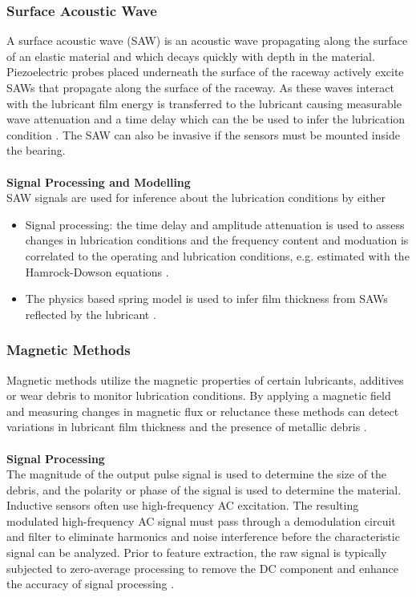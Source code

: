 \subsubsection{Surface Acoustic Wave}
A surface acoustic wave (SAW) is an acoustic wave propagating along the surface of an elastic material and which decays quickly with depth in the material. Piezoelectric probes placed underneath the surface of the raceway actively excite SAWs that propagate along the surface of the raceway. As these waves interact with the lubricant film energy is transferred to the lubricant causing measurable wave attenuation and a time delay which can the be used to infer the lubrication condition \cite{kestel_condition_2025}. The SAW can also be invasive if the sensors must be mounted inside the bearing.
\\\\
\textbf{Signal Processing and Modelling}\\
SAW signals are used for inference about the lubrication conditions by either 
\begin{itemize}
    \item Signal processing: the time delay and amplitude attenuation is used to assess changes in lubrication conditions and the frequency content and moduation is correlated to the operating and lubrication conditions, e.g. estimated with the Hamrock-Dowson equations \cite{lindner_a23_2011} \cite{tatzgern_tribo-acoustic_2025}.
    \item The physics based spring model is used to infer film thickness from SAWs reflected by the lubricant \cite{tatzgern_tribo-acoustic_2025}.
\end{itemize}

\subsubsection{Magnetic Methods}
Magnetic methods utilize the magnetic properties of certain lubricants, additives or wear debris to monitor lubrication conditions. By applying a magnetic field and measuring changes in magnetic flux or reluctance these methods can detect variations in lubricant film thickness and the presence of metallic debris \cite{sun_online_2021}.
\\\\
\textbf{Signal Processing}\\
The magnitude of the output pulse signal is used to determine the size of the debris, and the polarity or phase of the signal is used to determine the material. Inductive sensors often use high-frequency AC excitation. The resulting modulated high-frequency AC signal must pass through a demodulation circuit and filter to eliminate harmonics and noise interference before the characteristic signal can be analyzed. Prior to feature extraction, the raw signal is typically subjected to zero-average processing to remove the DC component and enhance the accuracy of signal processing \cite{sun_online_2021} \cite{maruyama_lubrication_2019} \cite{shi_ultrasensitive_2022}.

